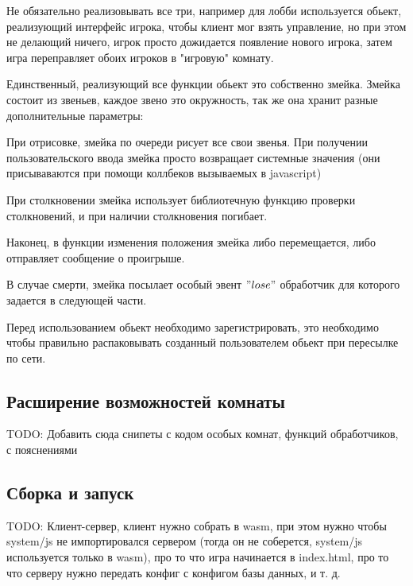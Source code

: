 \documentclass[a4paper,14pt, openany]{book}
\begin{document}
Не обязательно реализовывать все три, например для лобби используется обьект, реализующий интерфейс игрока, чтобы клиент мог взять управление, но при этом не делающий ничего, игрок просто дожидается появление нового игрока, затем игра переправляет обоих игроков в "игровую" комнату.

Единственный, реализующий все функции обьект это собственно змейка. Змейка состоит из звеньев, каждое звено это окружность, так же она хранит разные дополнительные параметры:


При отрисовке, змейка по очереди рисует все свои звенья. При получении пользовательского ввода змейка просто возвращает системные значения (они присываваются при помощи коллбеков вызываемых в javascript)


При столкновении змейка использует библиотечную функцию проверки столкновений, и при наличии столкновения погибает.

Наконец, в функции изменения положения змейка либо перемещается, либо отправляет сообщение о проигрыше. 



В случае смерти, змейка посылает особый эвент $"lose"$ обработчик для которого задается в следующей части. 

Перед использованием обьект необходимо зарегистрировать, это необходимо чтобы правильно распаковывать созданный пользователем обьект при пересылке по сети. 



\subsection{Расширение возможностей комнаты}

TODO: Добавить сюда снипеты с кодом особых комнат, функций обработчиков, с пояснениями

\subsection{Сборка и запуск}

TODO: Клиент-сервер, клиент нужно собрать в wasm, при этом нужно чтобы system/js не импортировался сервером (тогда он не соберется, system/js используется только в wasm), про то что игра начинается в index.html, про то что серверу нужно передать конфиг с конфигом базы данных, и т. д.
\end{document}

